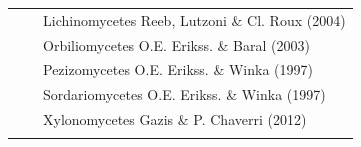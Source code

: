 \documentclass[]{book}
\begin{document}
\begin{longtable}[]{@{}lll@{}}
\begin{minipage}[t]{0.32\columnwidth}
\strut
\end{minipage} & \begin{minipage}[t]{0.28\columnwidth}\raggedright\strut
\strut
\end{minipage} & \begin{minipage}[t]{0.31\columnwidth}\raggedright\strut
Lichinomycetes Reeb, Lutzoni \& Cl. Roux (2004)\strut
\end{minipage}\tabularnewline
\begin{minipage}[t]{0.32\columnwidth}\raggedright\strut
\strut
\end{minipage} & \begin{minipage}[t]{0.28\columnwidth}\raggedright\strut
\strut
\end{minipage} & \begin{minipage}[t]{0.31\columnwidth}\raggedright\strut
Orbiliomycetes O.E. Erikss. \& Baral (2003)\strut
\end{minipage}\tabularnewline
\begin{minipage}[t]{0.32\columnwidth}\raggedright\strut
\strut
\end{minipage} & \begin{minipage}[t]{0.28\columnwidth}\raggedright\strut
\strut
\end{minipage} & \begin{minipage}[t]{0.31\columnwidth}\raggedright\strut
Pezizomycetes O.E. Erikss. \& Winka (1997)\strut
\end{minipage}\tabularnewline
\begin{minipage}[t]{0.32\columnwidth}\raggedright\strut
\strut
\end{minipage} & \begin{minipage}[t]{0.28\columnwidth}\raggedright\strut
\strut
\end{minipage} & \begin{minipage}[t]{0.31\columnwidth}\raggedright\strut
Sordariomycetes O.E. Erikss. \& Winka (1997)\strut
\end{minipage}\tabularnewline
\begin{minipage}[t]{0.32\columnwidth}\raggedright\strut
\strut
\end{minipage} & \begin{minipage}[t]{0.28\columnwidth}\raggedright\strut
\strut
\end{minipage} & \begin{minipage}[t]{0.31\columnwidth}\raggedright\strut
Xylonomycetes Gazis \& P. Chaverri (2012)\strut
\end{minipage}\tabularnewline
\begin{minipage}[t]{0.32\columnwidth}\raggedright\strut

\end{minipage}
\end{longtable}
\end{document}
